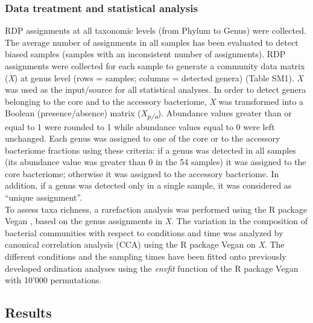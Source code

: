 \subsubsection{Data treatment and statistical analysis}
RDP assignments at all taxonomic levels (from Phylum to Genus) were collected. The average number of assignments in all samples has been evaluated to detect biased samples (samples with an inconsistent number of assignments). RDP assignments were collected for each sample to generate a community data matrix (\textit{X}) at genus level (rows = samples; columns = detected genera) (Table SM1). \textit{X} was used as the input/source for all statistical analyses. In order to detect genera belonging to the core and to the accessory bacteriome, \textit{X} was transformed into a Boolean (presence/absence) matrix (\textit{X}\textit{\textsubscript{p/a}}). Abundance values greater than or equal to 1 were rounded to 1 while abundance values equal to 0 were left unchanged. Each genus was assigned to one of the core or to the accessory bacteriome fractions using these criteria: if a genus was detected in all samples (its abundance value was greater than 0 in the 54 samples) it was assigned to the core bacteriome; otherwise it was assigned to the accessory bacteriome. In addition, if a genus was detected only in a single sample, it was considered as ``unique assignment''.\\
To assess taxa richness, a rarefaction analysis was performed using the R package Vegan \cite{oksanen2007vegan, dixon2003vegan}, based on the genus assignments in \textit{X}. The variation in the composition of bacterial communities with respect to conditions and time was analyzed by canonical correlation analysis (CCA) using the R package Vegan on \textit{X}. The different conditions and the sampling times have been fitted onto previously developed ordination analyses using the \textit{envfit} function of the R package Vegan with 10'000 permutations.\\

\subsection{Results}

